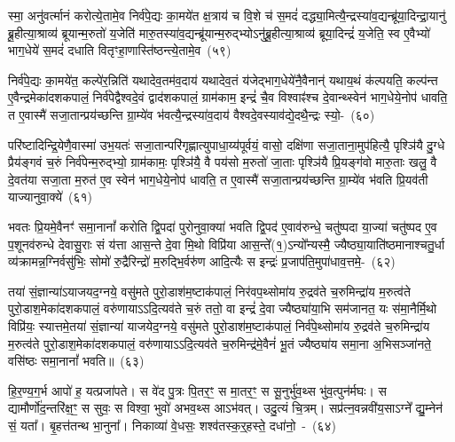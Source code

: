 स्मा॒ अनु॑वर्त्मानं करोत्ये॒तामे॒व निर्व॑पे॒द्यः का॒मये॑त क्ष॒त्राय॑ च वि॒शे च॑ स॒मदं॑ दद्ध्या॒मित्यै॒न्द्रस्या॑व॒द्यन्ब्रू॑या॒दिन्द्रा॒यानु॑ ब्रू॒हीत्या॒श्राव्य॑ ब्रूयान्म॒रुतो॑ य॒जेति॑ मारु॒तस्या॑व॒द्यन्ब्रू॑यान्म॒रुद्भ्यो\-ऽनु॑ब्रू॒हीत्या॒श्राव्य॑ ब्रूया॒दिन्द्रं॑ य॒जेति॒ स्व ए॒वैभ्यो॑ भाग॒\-धेये॑ स॒मदं॑ दधाति वितृꣳहा॒णास्ति॑ष्ठन्त्ये॒तामे॒व~(५९)\ip

निर्व॑पे॒द्यः का॒मये॑त॒ कल्पे॑र॒न्निति॑ यथादेव॒तम॑व॒दाय॑ यथादेव॒तं य॑जेद्भाग॒\-धेये॑नै॒वैनान्॑ यथाय॒थं क॑ल्पयति॒ कल्प॑न्त ए॒वैन्द्रमेका॑\-दश\-कपालं॒ निर्व॑पेद्वैश्वदे॒वं द्वाद॑श\-कपालं॒ ग्राम॑काम॒ इन्द्रं॑ चै॒व विश्वाꣴ॑श्च दे॒वान्थ्स्वेन॑ भाग॒\-धेये॒नोप॑ धावति॒ त ए॒वास्मै॑ सजा॒तान्प्रय॑च्छन्ति ग्रा॒म्ये॑व भ॑वत्यै॒न्द्रस्या॑व॒दाय॑ वैश्वदे॒वस्याव॑द्ये॒दथै॒न्द्रः स्यो॒-~(६०)\ip

परि॑ष्टादिन्द्रि॒येणै॒वास्मा॑ उभ॒यतः॑ सजा॒तान्परि॑\-गृह्णात्युपाधा॒य्य॑\-पूर्वयं॒ वासो॒ दक्षि॑णा सजा॒ताना॒मुप॑हित्यै॒ पृश्ञि॑यै दु॒ग्धे प्रैय॑ङ्गवं च॒रुं निर्व॑पेन्म॒रुद्भ्यो॒ ग्राम॑कामः॒ पृश्ञि॑यै॒ वै पय॑सो म॒रुतो॑ जा॒ताः पृश्ञि॑यै प्रि॒यङ्ग॑वो मारु॒ताः खलु॒ वै दे॒वत॑या सजा॒ता म॒रुत॑ ए॒व स्वेन॑ भाग॒\-धेये॒नोप॑ धावति॒ त ए॒वास्मै॑ सजा॒तान्प्रय॑च्छन्ति ग्रा॒म्ये॑व भ॑वति प्रि॒यव॑ती याज्यानुवा॒क्ये॑~(६१)\ip

भवतः प्रि॒यमे॒वैनꣳ॑ समा॒नानां᳚ करोति द्वि॒पदा॑ पुरोनुवा॒क्या॑ भवति द्वि॒पद॑ ए॒वाव॑\-रुन्धे॒ चतु॑ष्पदा या॒ज्या॑ चतु॑ष्पद ए॒व प॒शूनव॑\-रुन्धे देवासु॒राः सं य॑त्ता आस॒न्ते दे॒वा मि॒थो विप्रि॑या आस॒न्ते᳚(१॒)\-ऽन्यो᳚न्यस्मै॒ ज्यैष्ठ्या॒याति॑ष्ठमानाश्चतु॒र्धा व्य॑क्रामन्न॒ग्निर्वसु॑भिः॒ सोमो॑ रु॒द्रैरिन्द्रो॑ म॒रुद्भि॒र्वरु॑ण आदि॒त्यैः स इन्द्रः॑ प्र॒जा\-प॑ति॒मुपा॑धाव॒त्तमे॒-~(६२)\ip

तया॑ सं॒ज्ञान्या॑\-ऽयाजयद॒ग्नये॒ वसु॑मते पुरो॒डाश॑\-म॒ष्टा\-क॑पालं॒ निर॑वप॒थ्सोमा॑य रु॒द्रव॑ते च॒रुमिन्द्रा॑य म॒रुत्व॑ते पुरो॒डाश॒मेका॑\-दश\-कपालं॒ वरु॑णाया\-ऽऽ\-दि॒त्यव॑ते च॒रुं ततो॒ वा इन्द्रं॑ दे॒वा ज्यैष्ठ्या॑या॒भि सम॑जानत॒ यः स॑मा॒नैर्मि॒थो विप्रि॑यः॒ स्यात्तमे॒तया॑ सं॒ज्ञान्या॑ याजयेद॒ग्नये॒ वसु॑मते पुरो॒डाश॑\-म॒ष्टा\-क॑पालं॒ निर्व॑पे॒थ्सोमा॑य रु॒द्रव॑ते च॒रुमिन्द्रा॑य म॒रुत्व॑ते पुरो॒डाश॒मेका॑\-दश\-कपालं॒ वरु॑णाया\-ऽऽ\-दि॒त्यव॑ते च॒रुमिन्द्र॑मे॒वैनं॑ भू॒तं ज्यैष्ठ्या॑य समा॒ना अ॒भिसञ्जा॑नते॒ वसि॑ष्ठः समा॒नानां᳚ भवति॥~(६३)\ip

{\anuvakamend[{विश॑मे॒व ति॑ष्ठन्त्ये॒तामे॒वाथै॒न्द्रस्य॑ याज्यानुवा॒क्ये॑ तं वरु॑णाय॒ चतु॑र्दश च}]}


हि॒र॒ण्य॒ग॒र्भ आपो॑ ह॒ यत्प्रजा॑पते। स वे॑द पु॒त्रः पि॒तर॒ꣳ॒ स मा॒तर॒ꣳ॒ स सू॒नुर्भु॑व॒थ्स भु॑व॒त्पुन॑र्मघः। स द्यामौर्णो॑द॒न्तरि॑क्ष॒ꣳ॒ स सुवः॒ स विश्वा॒ भुवो॑ अभव॒थ्स आ\-ऽभ॑वत्। उदु॒त्यं चि॒त्रम्। सप्र॑त्न॒वन्नवी॑य॒सा\-ऽग्ने᳚ द्यु॒म्नेन॑ सं॒ यता᳚। बृ॒हत्त॑तन्थ भा॒नुना᳚। निकाव्या॑ वे॒धसः॒ शश्व॑तस्क॒र्॒\mbox{}हस्ते॒ दधा॑नो॒~-~(६४)\ip

